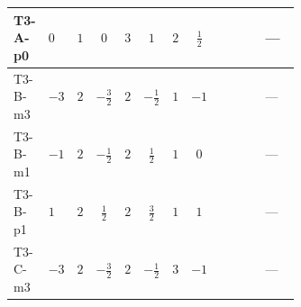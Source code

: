 \documentclass[8pt]{article}
\begin{document}
\begin{landscape}
\begin{longtable}{@{}llcccccc >{\raggedright\arraybackslash}p{0.21\linewidth} >{\raggedright\arraybackslash}p{0.21\linewidth} >{\raggedright\arraybackslash}p{0.21\linewidth}@{}}
\midrule
T3-A-p0 & $0$ & $1$ & $0$ & $3$ & $1$ & $2$ & $\frac{1}{2}$ & \scriptsize\adjustbox{max width=\linewidth}{$\begin{gathered} +8 {\lambda_{HS_2}^{(1)}} {\lambda_{HS_2}^{(A)}}\end{gathered}$} & \scriptsize\adjustbox{max width=\linewidth}{$\begin{gathered} +2 {\lambda_{HS_2}^{(A)}} {\lambda_{S_2}^{(1)}}\end{gathered}$} & --- \\
\midrule
T3-B-m3 & $-3$ & $2$ & $-\frac{3}{2}$ & $2$ & $-\frac{1}{2}$ & $1$ & $-1$ & \scriptsize\adjustbox{max width=\linewidth}{$\begin{gathered} +8 {\lambda_{HS_2}^{(1)}} {\lambda_{HS_2}^{(A)}}\end{gathered}$} & \scriptsize\adjustbox{max width=\linewidth}{$\begin{gathered} +2 {\lambda_{HS_2}^{(A)}} {\lambda_{S_2}^{(1)}}\end{gathered}$} & --- \\
\midrule
T3-B-m1 & $-1$ & $2$ & $-\frac{1}{2}$ & $2$ & $\frac{1}{2}$ & $1$ & $0$ & \scriptsize\adjustbox{max width=\linewidth}{$\begin{gathered} +8 {\lambda_{HS_2}^{(1)}} {\lambda_{HS_2}^{(A)}}\end{gathered}$} & \scriptsize\adjustbox{max width=\linewidth}{$\begin{gathered} +2 {\lambda_{HS_2}^{(A)}} {\lambda_{S_2}^{(1)}}\end{gathered}$} & --- \\
\midrule
T3-B-p1 & $1$ & $2$ & $\frac{1}{2}$ & $2$ & $\frac{3}{2}$ & $1$ & $1$ & \scriptsize\adjustbox{max width=\linewidth}{$\begin{gathered} +8 {\lambda_{HS_2}^{(1)}} {\lambda_{HS_2}^{(A)}}\end{gathered}$} & \scriptsize\adjustbox{max width=\linewidth}{$\begin{gathered} +2 {\lambda_{HS_2}^{(A)}} {\lambda_{S_2}^{(1)}}\end{gathered}$} & --- \\
\midrule
T3-C-m3 & $-3$ & $2$ & $-\frac{3}{2}$ & $2$ & $-\frac{1}{2}$ & $3$ & $-1$ & \scriptsize\adjustbox{max width=\linewidth}{$\begin{gathered} +8 {\lambda_{HS_2}^{(1)}} {\lambda_{HS_2}^{(A)}}\end{gathered}$} & \scriptsize\adjustbox{max width=\linewidth}{$\begin{gathered} +2 {\lambda_{HS_2}^{(A)}} {\lambda_{S_2}^{(1)}}\end{gathered}$} & --- \\

\end{longtable}
\end{landscape}
\end{document}
